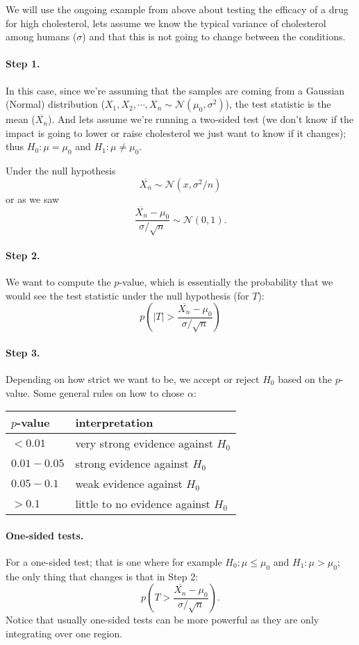 We will use the ongoing example from above about testing the efficacy of a drug for high cholesterol, 
lets assume we know the typical variance of cholesterol among humans ($\sigma$) and that this is not going to change between the conditions. 

\paragraph{Step 1. }
In this case, since we're assuming that the samples are coming from a Gaussian (Normal) distribution ($X_1,X_2,\cdots,X_n\sim\mathcal{N}(\mu_0,\sigma^2)$), 
the test statistic is the mean ($\overline{X_n}$). 
And lets assume we're running a two-sided test 
(we don't know if the impact is going to lower or raise cholesterol we just want to know if it changes); thus
$H_0: \mu = \mu_0$ and $H_1: \mu \ne  \mu_0$.

Under the null hypothesis \[\overline{X_n}\sim\mathcal{N}(x, \sigma^2/n)\] 
or as we saw \[\frac{\overline{X_n}-\mu_0}{\sigma/\sqrt{n}}\sim\mathcal{N}(0,1).\]

\paragraph{Step 2.}
We want to compute the $p$-value, which is essentially the probability that we would see the test statistic under the null hypothesis (for $T$):
\[p\left(\left|T\right| > \frac{\overline{X_n}-\mu_0}{\sigma/\sqrt{n}}\right)\]

\paragraph{Step 3.}
Depending on how strict we want to be, we accept or reject $H_0$ based on the $p$-value. 
Some general rules on how to chose $\alpha$:
\begin{center}\begin{tabular}{|l||l|}
\hline
$p$-value & interpretation\\
\hline\hline
$< 0.01$ & very strong evidence against $H_0$\\
$0.01-0.05$&strong evidence against $H_0$\\
$0.05-0.1$&weak evidence against $H_0$\\
$> 0.1$&little to no evidence against $H_0$\\
\hline
\end{tabular}\end{center}

\paragraph{One-sided tests.} 
For a one-sided test; that is one where for example $H_0: \mu \le \mu_0$ and $H_1: \mu > \mu_0$; 
the only thing that changes is that in Step 2: 
\[p\left(T > \frac{\overline{X_n}-\mu_0}{\sigma/\sqrt{n}}\right).\]
Notice that usually one-sided tests can be more powerful as they are only integrating over one region. 


